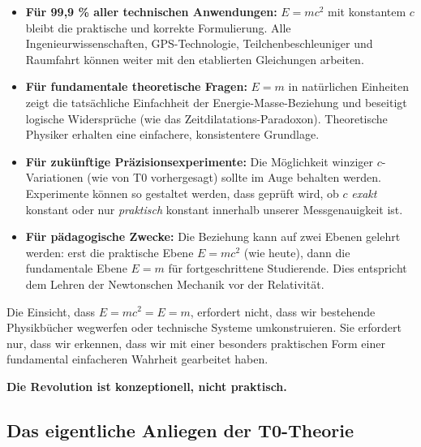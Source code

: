 	\begin{itemize}
		\item \textbf{Für 99,9 \% aller technischen Anwendungen:} \( E = mc^2 \) mit konstantem \( c \) bleibt die praktische und korrekte Formulierung. Alle Ingenieurwissenschaften, GPS-Technologie, Teilchenbeschleuniger und Raumfahrt können weiter mit den etablierten Gleichungen arbeiten.
		
		\item \textbf{Für fundamentale theoretische Fragen:} \( E = m \) in natürlichen Einheiten zeigt die tatsächliche Einfachheit der Energie-Masse-Beziehung und beseitigt logische Widersprüche (wie das Zeitdilatations-Paradoxon). Theoretische Physiker erhalten eine einfachere, konsistentere Grundlage.
		
		\item \textbf{Für zukünftige Präzisionsexperimente:} Die Möglichkeit winziger \( c \)-Variationen (wie von T0 vorhergesagt) sollte im Auge behalten werden. Experimente können so gestaltet werden, dass geprüft wird, ob \( c \) \textit{exakt} konstant oder nur \textit{praktisch} konstant innerhalb unserer Messgenauigkeit ist.
		
		\item \textbf{Für pädagogische Zwecke:} Die Beziehung kann auf zwei Ebenen gelehrt werden: erst die praktische Ebene \( E = mc^2 \) (wie heute), dann die fundamentale Ebene \( E = m \) für fortgeschrittene Studierende. Dies entspricht dem Lehren der Newtonschen Mechanik vor der Relativität.
	\end{itemize}
	
	\begin{tcolorbox}[colback=yellow!10!white,colframe=yellow!75!black,title=Die friedliche Revolution]
		Die Einsicht, dass \( E = mc^2 = E = m \), erfordert nicht, dass wir bestehende Physikbücher wegwerfen oder technische Systeme umkonstruieren. Sie erfordert nur, dass wir erkennen, dass wir mit einer besonders praktischen Form einer fundamental einfacheren Wahrheit gearbeitet haben.
		
		\textbf{Die Revolution ist konzeptionell, nicht praktisch.}
	\end{tcolorbox}
	
	\subsection{Das eigentliche Anliegen der T0-Theorie}
	
